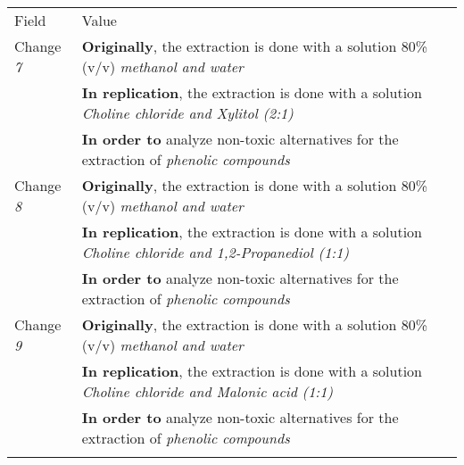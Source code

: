 \begin{table*}[h]
\label{tab:plantEng}
  \centering

\begin{tabularx}{\textwidth}{
  >{\hsize=0.25\hsize}X
  >{\hsize=0.8\hsize}X}
  
    \noalign{\smallskip}\hline\noalign{\smallskip}
  
  Field &  Value  \\ 
  \noalign{\smallskip}\hline\noalign{\smallskip}
     
    Change \textit{7}   & \textbf{Originally}, the extraction is done with a solution 80\% (v/v) \emph{methanol and water}  \\& \textbf{In replication}, the extraction is done with a solution \emph{Choline chloride and Xylitol (2:1)}  \\& \textbf{In order to} analyze non-toxic alternatives for the extraction of \emph{phenolic compounds}   \\ 
    \noalign{\smallskip\smallskip}\hline 
    
    
    Change \textit{8}   & \textbf{Originally}, the extraction is done with a solution 80\% (v/v) \emph{methanol and water}  \\& \textbf{In replication}, the extraction is done with a solution \emph{Choline chloride and 1,2-Propanediol (1:1)}  \\& \textbf{In order to} analyze non-toxic alternatives for the extraction of \emph{phenolic compounds}   \\ 
    \noalign{\smallskip\smallskip}\hline 

    Change \textit{9}   & \textbf{Originally}, the extraction is done with a solution 80\% (v/v) \emph{methanol and water}  \\& \textbf{In replication}, the extraction is done with a solution \emph{Choline chloride and Malonic acid (1:1)}  \\& \textbf{In order to} analyze non-toxic alternatives for the extraction of \emph{phenolic compounds}   \\ 
    \noalign{\smallskip\smallskip}\hline 
    

\end{tabularx}
\end{table*}
